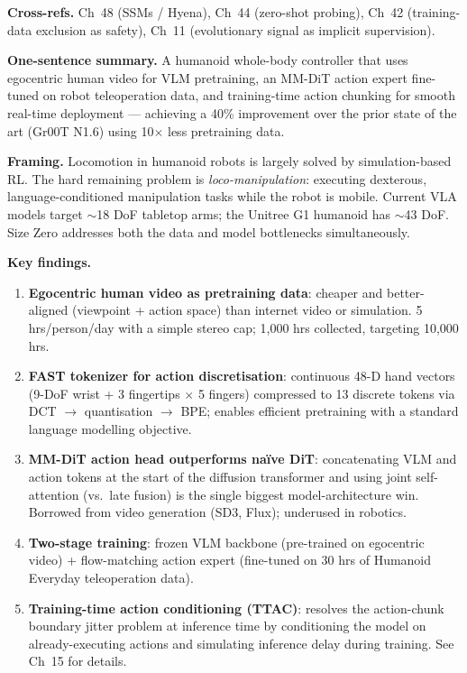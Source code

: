 \begin{paperbox}[title={EVO\,2: Genome Modelling and Design Across All Domains of Life
  (Brixi et al.\ 2025, Arc Institute / Together AI / Stanford, \textit{Nature})}]
\medskip
\textbf{Cross-refs.} Ch~48 (SSMs / Hyena), Ch~44 (zero-shot probing), Ch~42
(training-data exclusion as safety), Ch~11 (evolutionary signal as implicit
supervision).

\end{paperbox}

\begin{paperbox}[title={Size Zero: Open Foundation Model Towards Universal Humanoid
  Loco-Manipulation (Wang et al.\ 2025, USC)}]

\textbf{One-sentence summary.} A humanoid whole-body controller that uses egocentric human video for VLM pretraining, an MM-DiT action expert fine-tuned on robot teleoperation data, and training-time action chunking for smooth real-time deployment — achieving a 40\% improvement over the prior state of the art (Gr00T N1.6) using 10$\times$ less pretraining data.

\medskip
\textbf{Framing.} Locomotion in humanoid robots is largely solved by simulation-based RL. The hard remaining problem is \emph{loco-manipulation}: executing dexterous, language-conditioned manipulation tasks while the robot is mobile. Current VLA models target $\sim$18 DoF tabletop arms; the Unitree G1 humanoid has $\sim$43 DoF. Size Zero addresses both the data and model bottlenecks simultaneously.

\medskip
\textbf{Key findings.}
\begin{enumerate}
  \item \textbf{Egocentric human video as pretraining data}: cheaper and better-aligned (viewpoint + action space) than internet video or simulation. 5 hrs/person/day with a simple stereo cap; 1{,}000 hrs collected, targeting 10{,}000 hrs.
  \item \textbf{FAST tokenizer for action discretisation}: continuous 48-D hand vectors (9-DoF wrist + 3 fingertips $\times$ 5 fingers) compressed to 13 discrete tokens via DCT $\to$ quantisation $\to$ BPE; enables efficient pretraining with a standard language modelling objective.
  \item \textbf{MM-DiT action head outperforms naïve DiT}: concatenating VLM and action tokens at the start of the diffusion transformer and using joint self-attention (vs.\ late fusion) is the single biggest model-architecture win. Borrowed from video generation (SD3, Flux); underused in robotics.
  \item \textbf{Two-stage training}: frozen VLM backbone (pre-trained on egocentric video) + flow-matching action expert (fine-tuned on 30 hrs of Humanoid Everyday teleoperation data).
  \item \textbf{Training-time action conditioning (TTAC)}: resolves the action-chunk boundary jitter problem at inference time by conditioning the model on already-executing actions and simulating inference delay during training. See Ch~15 for details.
\end{enumerate}


\end{paperbox}

